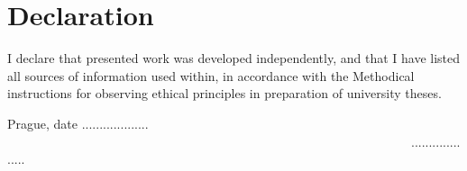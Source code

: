 \vspace{10cm}

\section*{Declaration}
I declare that presented work was developed independently, and that I have listed all
sources of information used within, in accordance with the Methodical instructions for
observing ethical principles in preparation of university theses.

\vspace{2cm}
Prague, date ................... \ \ \ \ \ \ \ \ \ \ \ \ \ \ \ \ \ \ \ \ \ \ \ \ \ \ \ \ \ \ \ \ \ \ \ \ \ \ \ \ \ \ \ \ \ \ \ \ \ \ \ \ \ \ \ \ \ \ \ \ \ \ \ \ ................... 





